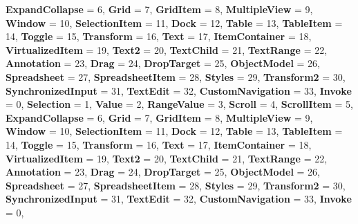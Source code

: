 \begin{DoxyCompactItemize}
{\bfseries Expand\+Collapse} = 6, 
{\bfseries Grid} = 7, 
{\bfseries Grid\+Item} = 8, 
{\bfseries Multiple\+View} = 9, 
\newline
{\bfseries Window} = 10, 
{\bfseries Selection\+Item} = 11, 
{\bfseries Dock} = 12, 
{\bfseries Table} = 13, 
\newline
{\bfseries Table\+Item} = 14, 
{\bfseries Toggle} = 15, 
{\bfseries Transform} = 16, 
{\bfseries Text} = 17, 
\newline
{\bfseries Item\+Container} = 18, 
{\bfseries Virtualized\+Item} = 19, 
{\bfseries Text2} = 20, 
{\bfseries Text\+Child} = 21, 
\newline
{\bfseries Text\+Range} = 22, 
{\bfseries Annotation} = 23, 
{\bfseries Drag} = 24, 
{\bfseries Drop\+Target} = 25, 
\newline
{\bfseries Object\+Model} = 26, 
{\bfseries Spreadsheet} = 27, 
{\bfseries Spreadsheet\+Item} = 28, 
{\bfseries Styles} = 29, 
\newline
{\bfseries Transform2} = 30, 
{\bfseries Synchronized\+Input} = 31, 
{\bfseries Text\+Edit} = 32, 
{\bfseries Custom\+Navigation} = 33, 
\newline
{\bfseries Invoke} = 0, 
{\bfseries Selection} = 1, 
{\bfseries Value} = 2, 
{\bfseries Range\+Value} = 3, 
\newline
{\bfseries Scroll} = 4, 
{\bfseries Scroll\+Item} = 5, 
{\bfseries Expand\+Collapse} = 6, 
{\bfseries Grid} = 7, 
\newline
{\bfseries Grid\+Item} = 8, 
{\bfseries Multiple\+View} = 9, 
{\bfseries Window} = 10, 
{\bfseries Selection\+Item} = 11, 
\newline
{\bfseries Dock} = 12, 
{\bfseries Table} = 13, 
{\bfseries Table\+Item} = 14, 
{\bfseries Toggle} = 15, 
\newline
{\bfseries Transform} = 16, 
{\bfseries Text} = 17, 
{\bfseries Item\+Container} = 18, 
{\bfseries Virtualized\+Item} = 19, 
\newline
{\bfseries Text2} = 20, 
{\bfseries Text\+Child} = 21, 
{\bfseries Text\+Range} = 22, 
{\bfseries Annotation} = 23, 
\newline
{\bfseries Drag} = 24, 
{\bfseries Drop\+Target} = 25, 
{\bfseries Object\+Model} = 26, 
{\bfseries Spreadsheet} = 27, 
\newline
{\bfseries Spreadsheet\+Item} = 28, 
{\bfseries Styles} = 29, 
{\bfseries Transform2} = 30, 
{\bfseries Synchronized\+Input} = 31, 
\newline
{\bfseries Text\+Edit} = 32, 
{\bfseries Custom\+Navigation} = 33, 
{\bfseries Invoke} = 0, 

\end{DoxyCompactItemize}
